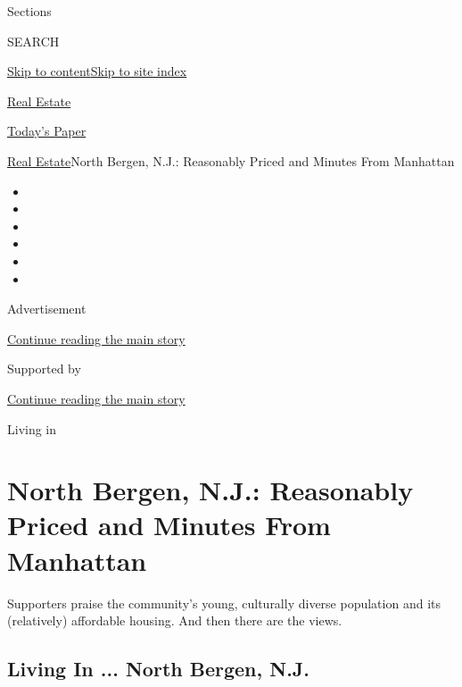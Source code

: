 Sections

SEARCH

\protect\hyperlink{site-content}{Skip to
content}\protect\hyperlink{site-index}{Skip to site index}

\href{https://www.nytimes3xbfgragh.onion/section/realestate}{Real
Estate}

\href{https://myaccount.nytimes3xbfgragh.onion/auth/login?response_type=cookie\&client_id=vi}{}

\href{https://www.nytimes3xbfgragh.onion/section/todayspaper}{Today's
Paper}

\href{/section/realestate}{Real Estate}\textbar{}North Bergen, N.J.:
Reasonably Priced and Minutes From Manhattan

\begin{itemize}
\item
\item
\item
\item
\item
\item
\end{itemize}

Advertisement

\protect\hyperlink{after-top}{Continue reading the main story}

Supported by

\protect\hyperlink{after-sponsor}{Continue reading the main story}

Living in

\hypertarget{north-bergen-nj-reasonably-priced-and-minutes-from-manhattan}{%
\section{North Bergen, N.J.: Reasonably Priced and Minutes From
Manhattan}\label{north-bergen-nj-reasonably-priced-and-minutes-from-manhattan}}

Supporters praise the community's young, culturally diverse population
and its (relatively) affordable housing. And then there are the views.

\href{https://www.nytimes3xbfgragh.onion/slideshow/2020/07/29/realestate/living-in-north-bergen-nj.html}{}

\hypertarget{living-in--north-bergen-nj}{%
\subsection{Living In ... North Bergen,
N.J.}\label{living-in--north-bergen-nj}}

